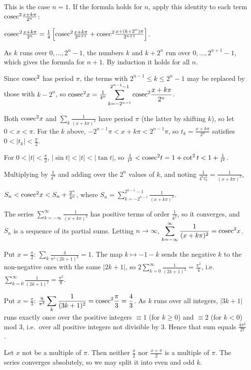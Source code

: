   This is the case $n = 1$. If the formula holds for $n$, apply this identity to each term ${\rm
    cosec}^2\frac{x + k\pi}{2^n}$:

  ${\rm cosec}^2\frac{x + k\pi}{2^n} = \frac{1}{4}\left[{\rm cosec}^2\frac{x + k\pi}{2^{n + 1}} + {\rm
      cosec}^2\frac{x + (k + 2^n)\pi}{2^{n + 1}}\right]$.

  As $k$ runs over $0, \ldots, 2^n - 1$, the numbers $k$ and $k + 2^n$ run over $0, \ldots, 2^{n + 1} - 1$,
  which gives the formula for $n + 1$. By induction it holds for all $n$.

  Since ${\rm cosec}^2$ has period $\pi$, the terms with $2^{n - 1}\leq k\leq 2^n - 1$ may be replaced by
  those with $k - 2^n$, so ${\rm cosec}^2x = \frac{1}{4^n}\displaystyle\sum_{k = -2^{n - 1}}^{2^{n - 1} - 1}{\rm
    cosec}^2\frac{x + k\pi}{2^n}$.

  Both ${\rm cosec}^2x$ and $\displaystyle\sum_k\frac{1}{(x + k\pi)^2}$ have period $\pi$ (the latter by
  shifting $k$), so let $0 < x < \pi$. For the $k$ above, $-2^{n - 1}\pi < x + k\pi < 2^{n - 1}\pi$, so $t_k
  = \frac{x + k\pi}{2^n}$ satisfies $0 < |t_k| < \frac{\pi}{2}$.

  For $0 < |t| < \frac{\pi}{2}$, $|\sin t| < |t| < |\tan t|$, so $\frac{1}{t^2} < {\rm cosec}^2t = 1 +
  \cot^2t < 1 + \frac{1}{t^2}$.

  Multiplying by $\frac{1}{4^n}$ and adding over the $2^n$ values of $k$, and noting $\frac{1}{4^nt_k^2}
  = \frac{1}{(x + k\pi)^2}$,

  $S_n < {\rm cosec}^2x < S_n + \frac{2^n}{4^n}$, where $S_n = \displaystyle\sum_{k = -2^{n - 1}}^{2^{n - 1}
    - 1}\frac{1}{(x + k\pi)^2}$.

  The series $\displaystyle\sum_{k = -\infty}^\infty\frac{1}{(x + k\pi)^2}$ has positive terms of order
  $\frac{1}{k^2}$, so it converges, and $S_n$ is a sequence of its partial sums. Letting $n\to\infty$,
  $\displaystyle\sum_{k = -\infty}^{\infty}\frac{1}{(x + k\pi)^2} = {\rm cosec}^2x$.

  Put $x = \frac{\pi}{2}$: $\displaystyle\sum_k\frac{4}{\pi^2(2k + 1)^2} = 1$. The map $k\mapsto -1 - k$
  sends the negative $k$ to the non-negative ones with the same $|2k + 1|$, so $2\displaystyle\sum_{k =
    0}^\infty\frac{1}{(2k + 1)^2} = \frac{\pi^2}{4}$, i.e.\ $\displaystyle\sum_{k = 0}^\infty\frac{1}{(2k +
    1)^2} = \frac{\pi^2}{8}$.

  Put $x = \frac{\pi}{3}$: $\frac{9}{\pi^2}\displaystyle\sum_k\frac{1}{(3k + 1)^2} = {\rm
    cosec}^2\frac{\pi}{3} = \frac{4}{3}$. As $k$ runs over all integers, $|3k + 1|$ runs exactly once over the
  positive integers $\equiv 1$ (for $k\geq 0$) and $\equiv 2$ (for $k < 0$) mod $3$, i.e.\ over all positive
  integers not divisible by $3$. Hence that sum equals $\frac{4\pi^2}{27}$.
\item Let $x$ not be a multiple of $\pi$. Then neither $\frac{x}{2}$ nor $\frac{x + \pi}{2}$ is a multiple
  of $\pi$. The series converges absolutely, so we may split it into even and odd $k$.

